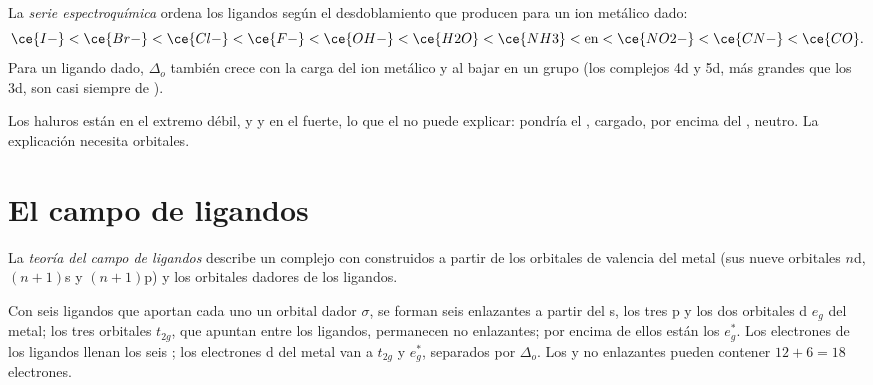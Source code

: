 \begin{definition}\label{def:b2:ligand-field:spectrochemical}
La \emph{serie espectroquímica} ordena los ligandos según el
desdoblamiento que producen para un ion metálico dado:
\[
  \ce{I-} < \ce{Br-} < \ce{Cl-} < \ce{F-} < \ce{OH-} < \ce{H2O} < \ce{NH3} < \text{en} <
  \ce{NO2-} < \ce{CN-} < \ce{CO} .
\]
Para un ligando dado, $\Delta_o$ también crece con la carga del ion metálico y al bajar en un grupo
(los complejos 4d y 5d, más grandes que los 3d, son casi siempre de ).
\end{definition}

Los haluros están en el extremo débil, y  y  en el fuerte, lo que el
 no puede explicar: pondría el , cargado, por encima del ,
neutro. La explicación necesita orbitales.

\section{El campo de ligandos}

\begin{definition}\label{def:b2:ligand-field:ligand-field}
La \emph{teoría del campo de ligandos} describe un complejo con 
construidos a partir de los orbitales de valencia del metal (sus nueve orbitales $n$d, $(n+1)$s y $(n+1)$p)
y los orbitales dadores de los ligandos.
\end{definition}

\begin{proposition}\label{prop:b2:ligand-field:mo-octahedral}
Con seis ligandos que aportan cada uno un orbital dador $\sigma$, se forman seis  enlazantes
a partir del s, los tres p y los dos orbitales d $e_g$ del metal; los tres orbitales $t_{2g}$, que
apuntan entre los ligandos, permanecen no enlazantes; por encima de ellos están los 
$e_g^*$. Los electrones de los ligandos llenan los seis ; los electrones d del metal van
a $t_{2g}$ y $e_g^*$, separados por $\Delta_o$. Los  y no enlazantes pueden contener
$12 + 6 = 18$ electrones.
\end{proposition}

